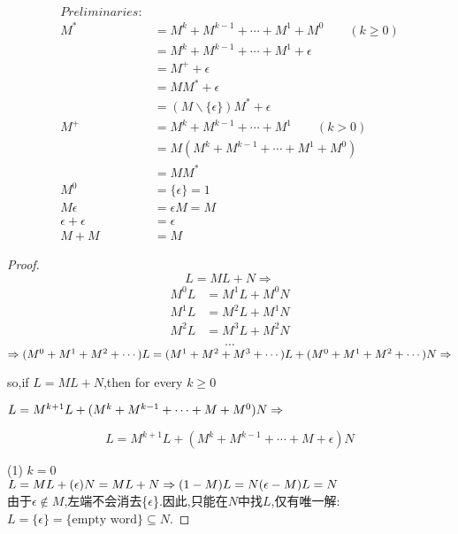 \begin{solution}
	\begin{align*} Preliminaries:\\
		M^{\ast} &= M^{k} + M^{k-1} + \cdots + M^{1} + M^{0} \qquad (k\geq 0)\\
		         &= M^{k} + M^{k-1} + \cdots + M^{1} + \epsilon \\ 
		         &= M^{+} + \epsilon\\
		         &= MM^{*} + \epsilon\\
		         &= (M\backslash\{\epsilon\})M^{*} + \epsilon\\
		M^{+} &= M^{k} + M^{k-1} + \cdots + M^{1} \qquad (k > 0)\\
		      &= M(M^{k} + M^{k-1} + \cdots + M^{1} + M^{0}) \\ 
		      &= MM^{*}\\
	    M^{0} &= \{\epsilon\} = 1\\
	    M\epsilon &= \epsilon M = M\\
	    \epsilon+\epsilon &=\epsilon\\
	    M+M &= M
	\end{align*}
	\begin{proof}
		$$L = ML + N \Rightarrow$$  
		\begin{align}
			M^0L &= M^1L + M^0N \\
			M^1L &= M^2L + M^1N \\ 
			M^2L &= M^3L + M^2N \\ 
		\end{align}
		$$\cdots$$
		$\Rightarrow\\ (M^0+M^1+M^2+\cdots)L = (M^1+M^2+M^3+\cdots)L + (M^0+M^1+M^2+\cdots)N \\ \Rightarrow$ 
	    
	    so,if $L = ML +N$,then for every $k \ge 0$
	    
		$L = M^{k+1}L + (M^k+M^{k-1}+\cdots+M+M^0)N \\ \Rightarrow$
		
		\begin{equation}\label{leq}
			L = M^{k+1}L + (M^k+M^{k-1}+\cdots+M+\epsilon)N
		\end{equation}
		
		(1) $k = 0$\\
		$L = ML + (\epsilon)N = ML + N \\ \Rightarrow 
		(1-M)L = N \\
		(\epsilon-M)L = N$\\
		由于$\epsilon \notin M$,左端不会消去\{$\epsilon$\}.因此,只能在$N$中找$L$,仅有唯一解: $L
		=\{\epsilon\} = \text{\{empty word\}} \subseteq N$.  


\end{proof}
\end{solution}
